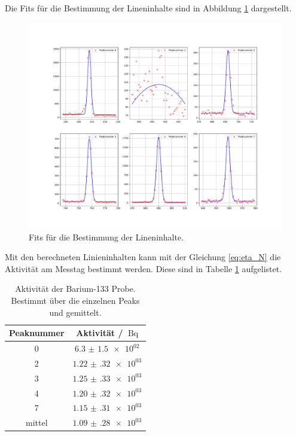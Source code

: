 \FloatBarrier
Die Fits für die Bestimmung der Lineninhalte sind in Abbildung \ref{fig:Linieninhalt_03} dargestellt.
\FloatBarrier
\begin{figure}
  \centering
  \includegraphics[width=\textwidth,keepaspectratio]{figure/03_subplot.pdf}
  \caption{Fits für die Bestimmung der Lineninhalte.}
  \label{fig:Linieninhalt_03}
\end{figure}
Mit den berechneten Linieninhalten kann mit der Gleichung \eqref{eq:eta_N} die Aktivität am Messtag bestimmt werden. 
Diese sind in Tabelle \ref{tab:Akti_03} aufgelistet.
\FloatBarrier
\begin{table}
  \centering
  \caption{Aktivität der Barium-133 Probe. Bestimmt über die einzelnen Peaks und gemittelt.}
  \label{tab:Akti_03}
  \begin{tabular}{c c}
    \toprule
    Peaknummer & Aktivität / $\SI{}{\becquerel}$\\
    \midrule
    0&$\num{6.3(15)e+02}$\\
    2&$\num{1.22(32)e+03}$\\
    3&$\num{1.25(33)e+03}$\\
    4&$\num{1.20(32)e+03}$\\
    7&$\num{1.15(31)e+03}$\\
    \midrule
    mittel& $\num{1.09(28)e+03}$\\
    \bottomrule
  \end{tabular}
\end{table}
